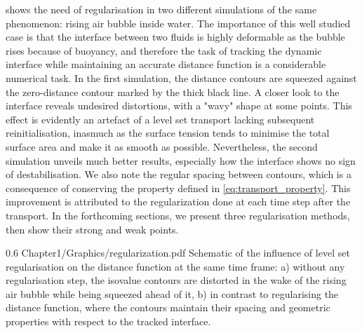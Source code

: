  shows the need of regularisation in two different 
simulations of the same phenomenon: rising air bubble inside
water. The importance of this well studied case \citep{sussman_level_1994,hysing_quantitative_2009}
is that the interface between two fluids is highly deformable
as the bubble rises because of buoyancy, and therefore the task of tracking the 
dynamic interface while maintaining an accurate distance function
is a considerable numerical task. In the first simulation, the distance contours 
are squeezed against the zero-distance contour marked by the 
thick black line. A closer look to the interface reveals undesired distortions, with a 
"wavy" shape at some points. This effect is evidently an artefact
of a level set transport lacking subsequent reinitialisation, inasmuch 
as the surface tension tends to minimise the total surface area and make it as smooth
as possible. Nevertheless, the second simulation unveils much better results, especially 
how the interface shows no sign of destabilisation. We also note the regular spacing between contours,
which is a consequence of conserving the property defined in \cref{eq:transport_property}.
This improvement is attributed to the regularization done at each time step after the transport.
In the forthcoming sections, we present three regularisation methods, then show their strong and weak points.
\begin{figureth}
{0.6}
{Chapter1/Graphics/regularization.pdf}
{Schematic of the influence of level set regularisation on the distance function at the same time frame: 
a) without any regularisation step, the isovalue contours are distorted in the wake of the rising air 
bubble while being squeezed ahead of it, 
b) in contrast to regularising the distance function, where the contours maintain their spacing and geometric 
properties with respect to the tracked interface.}
\label{fig:reinit_influence}
\end{figureth}
%
